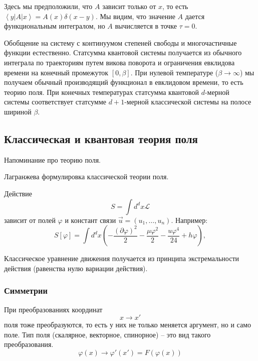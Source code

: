 \documentclass[a4paper,12pt]{article}
\theoremstyle{definition}
\theoremstyle{definition}
\theoremstyle{definition}
\begin{document}
Здесь мы предположили, что $A$ зависит только от $x$, то есть $\left<y\right| A\left|x\right>=A(x)\delta(x-y)$. Мы видим, что значение $A$ дается функциональным интегралом, но $A$ вычисляется в точке $\tau=0$. 

Обобщение на систему с континуумом степеней свободы и многочастичные функции естественно. Статсумма квантовой системы получается из обычного интеграла по траекториям путем викова поворота и ограничения евклидова времени на конечный промежуток $[0,\beta]$. При нулевой температуре ($\beta\to \infty$) мы получаем обычный производящий функционал в евклидовом времени, то есть теорию поля. При конечных температурах статсумма квантовой $d$-мерной системы соответствует статсумме $d+1$-мерной классической системы на полосе шириной $\beta$.

\subsection*{Классическая и квантовая теория поля}
\label{sec:qft}
Напоминание про теорию поля.

Лагранжева формулировка классической теории поля.

 Действие
\begin{equation}
  S=\int d^dx \mathcal{L}
\end{equation}
зависит от полей $\varphi$ и констант связи $\vec u=(u_1,\dots,u_n)$.
Например:
\begin{equation}
  S[\varphi]=\int d^d x\left( -\frac{(\partial \varphi)^2}{2}-\frac{\mu \varphi^2}{2}-\frac{u\varphi^4}{24}+h\varphi\right),
\end{equation}

Классическое уравнение движения получается из принципа экстремальности действия (равенства нулю вариации действия).

\subsubsection*{Симметрии}
\label{sec:symmetry}

При преобразованиях координат
\begin{equation}
  \label{eq:303}
  x\to x'
\end{equation}
поля тоже преобразуются, то есть у них не только меняется аргумент, но и само поле. Тип поля (скалярное, векторное, спинорное) -- это вид такого преобразования.
\begin{equation}
  \label{eq:304}
  \varphi(x)\to \varphi'(x')=F(\varphi(x))
\end{equation}
\end{document}

